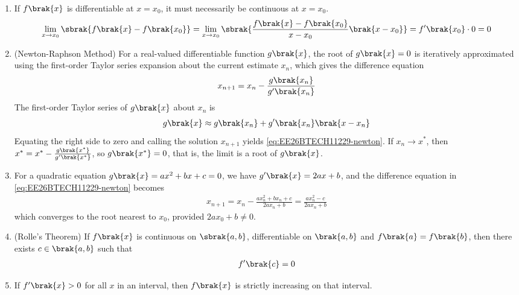 \begin{enumerate}[label=\thesubsection.\arabic*, ref=\thesubsection.\theenumi]
\begin{align}
\end{align}
\item If $f\brak{x}$ is differentiable at $x = x_0$, it must necessarily be continuous at $x = x_0$.
\\
\solution
\begin{align}
	\lim_{x \to x_0}\sbrak{f\brak{x} - f\brak{x_0}}
	= \lim_{x \to x_0}\sbrak{\frac{f\brak{x} - f\brak{x_0}}{x - x_0}\brak{x - x_0}}
	= f^{\prime}\brak{x_0}\cdot 0 = 0
	\label{eq:EE26BTECH11229-diff-cont}
\end{align}
\item (Newton-Raphson Method) For a real-valued differentiable function $g\brak{x}$, the root of $g\brak{x} = 0$ is iteratively approximated using the first-order Taylor series expansion about the current estimate $x_n$, which gives the difference equation
\begin{align}
	x_{n+1} = x_n - \frac{g\brak{x_n}}{g^{\prime}\brak{x_n}}
	\label{eq:EE26BTECH11229-newton}
\end{align}
\solution
The first-order Taylor series of $g\brak{x}$ about $x_n$ is
\begin{align}
	g\brak{x} \approx g\brak{x_n} + g^{\prime}\brak{x_n}\brak{x - x_n}
\end{align}
Equating the right side to zero and calling the solution $x_{n+1}$ yields \eqref{eq:EE26BTECH11229-newton}. If $x_n \to x^*$, then $x^* = x^* - \frac{g\brak{x^*}}{g^{\prime}\brak{x^*}}$, so $g\brak{x^*} = 0$, that is, the limit is a root of $g\brak{x}$.
\item For a quadratic equation $g\brak{x} = ax^2 + bx + c = 0$, we have $g^{\prime}\brak{x} = 2ax + b$, and the difference equation in \eqref{eq:EE26BTECH11229-newton} becomes
\begin{align}
	x_{n+1} = x_n - \frac{ax_n^2 + bx_n + c}{2ax_n + b} = \frac{ax_n^2 - c}{2ax_n + b}
	\label{eq:EE26BTECH11229-newton-quad}
\end{align}
which converges to the root nearest to $x_0$, provided $2ax_0 + b \neq 0$.
\item (Rolle's Theorem) If $f\brak{x}$ is continuous on $\sbrak{a, b}$, differentiable on $\brak{a, b}$ and $f\brak{a} = f\brak{b}$, then there exists $c \in \brak{a, b}$ such that
\begin{align}
	f^{\prime}\brak{c} = 0
	\label{eq:EE26BTECH11229-rolle}
\end{align}
\item If $f^{\prime}\brak{x} > 0$ for all $x$ in an interval, then $f\brak{x}$ is strictly increasing on that interval.
\label{eq:EE26BTECH11229-increasing}


\end{enumerate}
